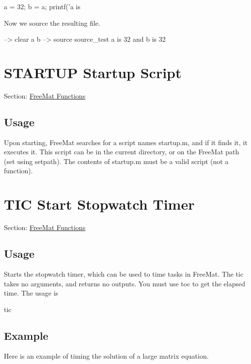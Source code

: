 \begin{DoxyVerbInclude}
a = 32;
b = a;
printf('a is %
\end{DoxyVerbInclude}


Now we source the resulting file.


\begin{DoxyVerbInclude}
--> clear a b
--> source source_test
a is 32 and b is 32
\end{DoxyVerbInclude}
 \hypertarget{freemat_startup}{}\section{S\-T\-A\-R\-T\-U\-P Startup Script}\label{freemat_startup}
Section\-: \hyperlink{sec_freemat}{Free\-Mat Functions} \hypertarget{vtkwidgets_vtkxyplotwidget_Usage}{}\subsection{Usage}\label{vtkwidgets_vtkxyplotwidget_Usage}
Upon starting, Free\-Mat searches for a script names {\ttfamily startup.\-m}, and if it finds it, it executes it. This script can be in the current directory, or on the Free\-Mat path (set using {\ttfamily setpath}). The contents of startup.\-m must be a valid script (not a function). \hypertarget{freemat_tic}{}\section{T\-I\-C Start Stopwatch Timer}\label{freemat_tic}
Section\-: \hyperlink{sec_freemat}{Free\-Mat Functions} \hypertarget{vtkwidgets_vtkxyplotwidget_Usage}{}\subsection{Usage}\label{vtkwidgets_vtkxyplotwidget_Usage}
Starts the stopwatch timer, which can be used to time tasks in Free\-Mat. The {\ttfamily tic} takes no arguments, and returns no outputs. You must use {\ttfamily toc} to get the elapsed time. The usage is \begin{DoxyVerb}  tic
\end{DoxyVerb}
 \hypertarget{variables_struct_Example}{}\subsection{Example}\label{variables_struct_Example}
Here is an example of timing the solution of a large matrix equation.


